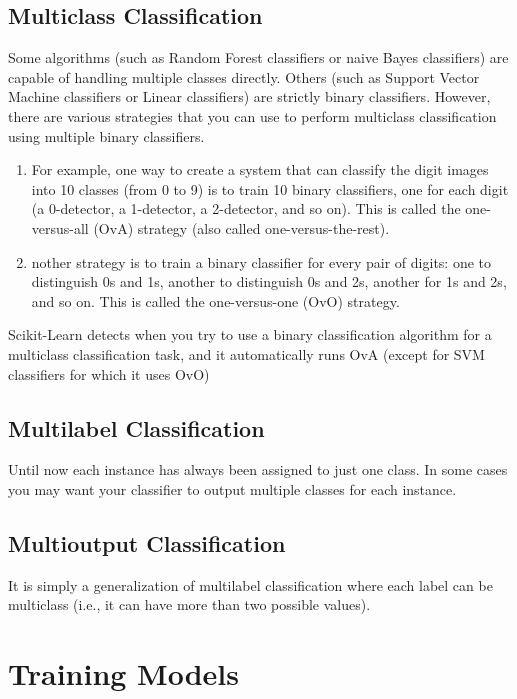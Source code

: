 \documentclass[french]{article}
\begin{document}
\subsection{Multiclass Classification}

Some algorithms (such as Random Forest classifiers or naive Bayes classifiers) are capable of handling multiple classes directly. Others (such as Support Vector Machine classifiers or Linear classifiers) are strictly binary classifiers. However, there are various strategies that you can use to perform multiclass classification using multiple binary classifiers.

\begin{enumerate}
    \item For example, one way to create a system that can classify the digit images into 10 classes (from 0 to 9) is to train 10 binary classifiers, one for each digit (a 0-detector, a 1-detector, a 2-detector, and so on). This is called the one-versus-all (OvA) strategy (also called one-versus-the-rest).
    \item nother strategy is to train a binary classifier for every pair of digits: one to distinguish 0s and 1s, another to distinguish 0s and 2s, another for 1s and 2s, and so on. This is called the one-versus-one (OvO) strategy.
\end{enumerate}

Scikit-Learn detects when you try to use a binary classification algorithm for a multiclass classification task, and it automatically runs OvA (except for SVM classifiers for which it uses OvO)

\subsection{Multilabel Classification}

Until now each instance has always been assigned to just one class. In some cases you may want your classifier to output multiple classes for each instance.

\subsection{Multioutput Classification}

It is simply a generalization of multilabel classification where each label can be multiclass (i.e., it can have more than two possible values).

\section{Training Models}
\end{document}
